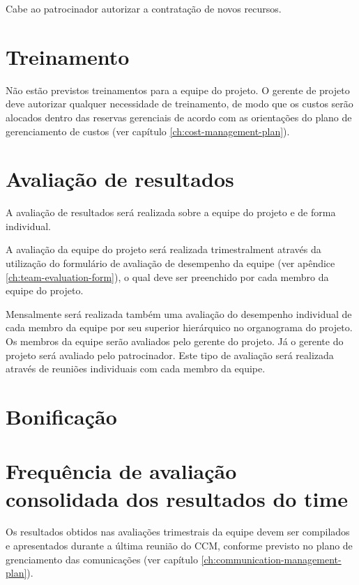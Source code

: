 Cabe ao patrocinador autorizar a contratação de novos recursos.

\section{Treinamento}

Não estão previstos treinamentos para a equipe do projeto. O gerente de projeto deve autorizar qualquer necessidade de treinamento, de modo que os custos serão alocados dentro das reservas gerenciais de acordo com as orientações do plano de gerenciamento de custos (ver capítulo \ref{ch:cost-management-plan}).

\section{Avaliação de resultados}

A avaliação de resultados será realizada sobre a equipe do projeto e de forma individual. 

A avaliação da equipe do projeto será realizada trimestralment através da utilização do formulário de avaliação de desempenho da equipe (ver apêndice \ref{ch:team-evaluation-form}), o qual deve ser preenchido por cada membro da equipe do projeto.

Mensalmente será realizada também uma avaliação do desempenho individual de cada membro da equipe por seu superior hierárquico no organograma do projeto. Os membros da equipe serão avaliados pelo gerente do projeto. Já o gerente do projeto será avaliado pelo patrocinador. Este tipo de avaliação será realizada através de reuniões individuais com cada membro da equipe.

\section{Bonificação}


\section{Frequência de avaliação consolidada dos resultados do time}

Os resultados obtidos nas avaliações trimestrais da equipe devem ser compilados e apresentados durante a última reunião do CCM, conforme previsto no plano de grenciamento das comunicações (ver capítulo \ref{ch:communication-management-plan}).

